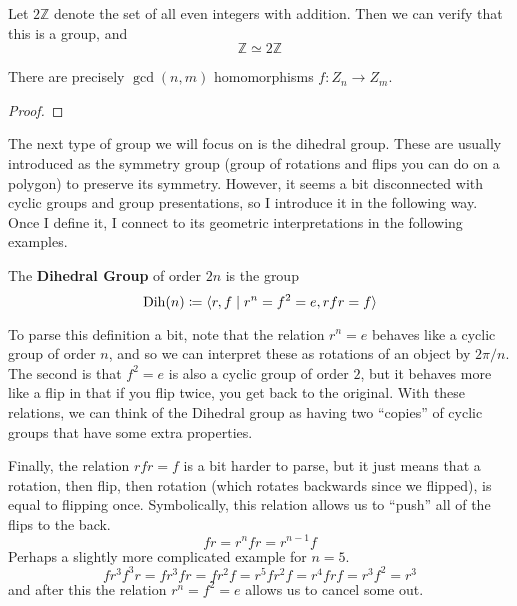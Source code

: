   \begin{example}
    Let $2 \mathbb{Z}$ denote the set of all even integers with addition. Then we can verify that this is a group, and 
    \begin{equation}
      \mathbb{Z} \simeq 2 \mathbb{Z}
    \end{equation}
  \end{example}

  \begin{theorem}
    There are precisely $\gcd(n, m)$ homomorphisms $f: Z_n \to Z_m$. 
  \end{theorem}
  \begin{proof}
    
  \end{proof}

  The next type of group we will focus on is the dihedral group. These are usually introduced as the symmetry group (group of rotations and flips you can do on a polygon) to preserve its symmetry. However, it seems a bit disconnected with cyclic groups and group presentations, so I introduce it in the following way. Once I define it, I connect to its geometric interpretations in the following examples. 

  \begin{definition}
    The \textbf{Dihedral Group} of order $2n$ is the group 
    \begin{equation}
      \operatorname{Dih}(n) \coloneqq \langle r, f \mid r^n = f^2 = e, rfr = f  \rangle
    \end{equation}
  \end{definition}

  To parse this definition a bit, note that the relation $r^n = e$ behaves like a cyclic group of order $n$, and so we can interpret these as rotations of an object by $2\pi/n$. The second is that $f^2 = e$ is also a cyclic group of order $2$, but it behaves more like a flip in that if you flip twice, you get back to the original. With these relations, we can think of the Dihedral group as having two ``copies'' of cyclic groups that have some extra properties. 

  Finally, the relation $rfr = f$ is a bit harder to parse, but it just means that a rotation, then flip, then rotation (which rotates backwards since we flipped), is equal to flipping once. Symbolically, this relation allows us to ``push'' all of the flips to the back. 
  \begin{equation} 
    f r = r^n f r = r^{n-1} f
  \end{equation}
  Perhaps a slightly more complicated example for $n = 5$. 
  \begin{equation}
    f r^3 f^3 r = f r^3 f r = f r^2 f = r^5 f r^2 f = r^4 f r f = r^3 f^2 = r^3
  \end{equation}
  and after this the relation $r^n = f^2 = e$ allows us to cancel some out. 

